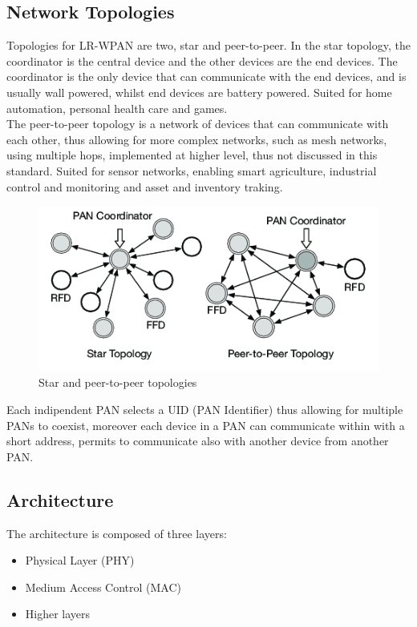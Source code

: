 \documentclass[conference]{IEEEtran}
\begin{document}
\subsection{Network Topologies}
Topologies for LR-WPAN are two, star and peer-to-peer.
In the star topology, the coordinator is the central device and the other devices are the
end devices. The coordinator is the only device that can communicate with the end devices,
and is usually wall powered, whilst end devices are battery powered.
Suited for home automation, personal health care and games.\\
The peer-to-peer topology is a network of devices that can communicate with each other,
thus allowing for more complex networks, such as mesh networks, using multiple hops, 
implemented at higher level, thus not discussed in this standard\cite{10794632}.
Suited for sensor networks, enabling smart agriculture, industrial control 
and monitoring and asset and inventory traking.
\begin{figure}[!h]
    \centering
    \includegraphics[width=1\linewidth]{topologies}
    \caption{Star and peer-to-peer topologies}
    \label{fig:topologies}
\end{figure}

Each indipendent PAN selects a UID (PAN Identifier) thus allowing for multiple PANs to coexist,
moreover each device in a PAN can communicate within with a short address, permits to
communicate also with another device from another PAN.\\

\subsection{Architecture}
The architecture is composed of three layers:
\begin{itemize}
    \item Physical Layer (PHY)
    \item Medium Access Control (MAC)
    \item Higher layers
\end{itemize}
\end{document}

